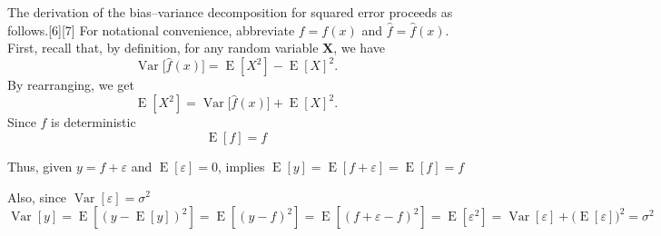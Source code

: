 The derivation of the bias–variance decomposition for squared error proceeds as follows.[6][7] For notational convenience, abbreviate $f = f(x)$ and $\hat{f} = \hat{f}(x)$. First, recall that, by definition, for any random variable $\mathbf{X}$, we have
$$\displaystyle \operatorname {Var} {\big [}{\hat {f}}(x){\big ]}=\operatorname {E} [X^{2}]-\operatorname {E} [X]^{2}.$$
By rearranging, we get 
$$\operatorname {E} [X^{2}] = \displaystyle \operatorname {Var} {\big [}{\hat {f}}(x){\big ]}+\operatorname {E} [X]^{2}.$$
Since $f$ is deterministic
$$\operatorname {E} [f] = f$$

Thus, given $y = f+\varepsilon$ and $\operatorname {E} [\varepsilon] = 0$, implies $\operatorname {E} [y] = \operatorname {E} [f+\varepsilon] = \operatorname {E} [f] = f$

Also, since $\operatorname{Var} [\varepsilon ]=\sigma ^{2}$
$$\displaystyle \operatorname {Var} [y]=\operatorname {E} [(y-\operatorname {E} [y])^{2}]=\operatorname {E} [(y-f)^{2}]=\operatorname {E} [(f+\varepsilon -f)^{2}]=\operatorname {E} [\varepsilon ^{2}]=\operatorname {Var} [\varepsilon ]+{\Big (}\operatorname {E} [\varepsilon ]{\Big )}^{2}=\sigma ^{2}$$


